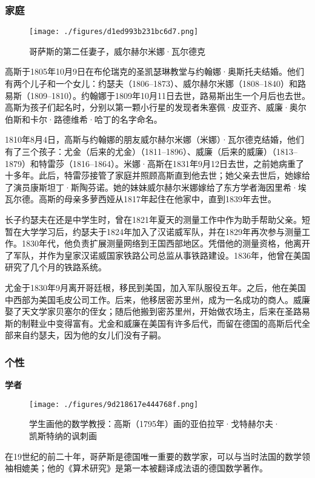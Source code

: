 \subsubsection{家庭}
\begin{figure}[ht]
\centering
\texttt{[image: ./figures/d1ed993b231bc6d7.png]}
\caption{哥萨斯的第二任妻子，威尔赫尔米娜·瓦尔德克} \label{fig_KRGS_5}
\end{figure}
高斯于1805年10月9日在布伦瑞克的圣凯瑟琳教堂与约翰娜·奥斯托夫结婚。他们有两个儿子和一个女儿：约瑟夫（1806–1873）、威尔赫尔米娜（1808–1840）和路易斯（1809–1810）。约翰娜于1809年10月11日去世，路易斯出生一个月后也去世。高斯为孩子们起名时，分别以第一颗小行星的发现者朱塞佩·皮亚齐、威廉·奥尔伯斯和卡尔·路德维希·哈丁的名字命名。

1810年8月4日，高斯与约翰娜的朋友威尔赫尔米娜（米娜）·瓦尔德克结婚，他们有了三个孩子：尤金（后来的尤金）（1811–1896）、威廉（后来的威廉）（1813–1879）和特雷莎（1816–1864）。米娜·高斯在1831年9月12日去世，之前她病重了十多年。此后，特雷莎接管了家庭并照顾高斯直到他去世；她父亲去世后，她嫁给了演员康斯坦丁·斯陶芬诺。她的妹妹威尔赫尔米娜嫁给了东方学者海因里希·埃瓦尔德。高斯的母亲多萝西娅从1817年起住在他家中，直到1839年去世。

长子约瑟夫在还是中学生时，曾在1821年夏天的测量工作中作为助手帮助父亲。短暂在大学学习后，约瑟夫于1824年加入了汉诺威军队，并在1829年再次参与测量工作。1830年代，他负责扩展测量网络到王国西部地区。凭借他的测量资格，他离开了军队，并作为皇家汉诺威国家铁路公司总监从事铁路建设。1836年，他曾在美国研究了几个月的铁路系统。

尤金于1830年9月离开哥廷根，移民到美国，加入军队服役五年。之后，他在美国中西部为美国毛皮公司工作。后来，他移居密苏里州，成为一名成功的商人。威廉娶了天文学家贝塞尔的侄女；随后他搬到密苏里州，开始做农场主，后来在圣路易斯的制鞋业中变得富有。尤金和威廉在美国有许多后代，而留在德国的高斯后代全部来自约瑟夫，因为他的女儿们没有子嗣。
\subsubsection{个性}  
\textbf{学者}
\begin{figure}[ht]
\centering
\texttt{[image: ./figures/9d218617e444768f.png]}
\caption{学生画他的数学教授：高斯（1795年）画的亚伯拉罕·戈特赫尔夫·凯斯特纳的讽刺画} \label{fig_KRGS_9}
\end{figure}
在19世纪的前二十年，哥萨斯是德国唯一重要的数学家，可以与当时法国的数学领袖相媲美；他的《算术研究》是第一本被翻译成法语的德国数学著作。

